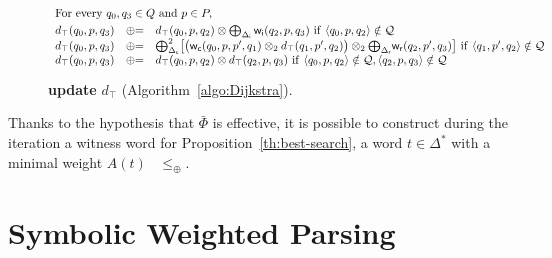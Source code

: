 \begin{figure}[ht]
\(
\begin{array}{lcl}
\multicolumn{3}{l}{%
 \mbox{For~every}\  q_0, q_3 \in Q\ \mbox{and}\ p \in P,}\\[1mm] %
d_\top(q_0, p, q_3) & \opluseq &
  d_\top(q_0, p, q_2) \otimes
  \bigoplus_{\Deltai} \weii(q_2, p, q_3)\
  \mathrm{if~} \< q_0, p, q_2> \notin \Q \\
d_\top(q_0, p, q_3) & \opluseq &
  {\bigoplus^2_{\Deltac}}
  \bigl[ \bigl( \weic(q_0, p, p', q_1) \otimes_2
  d_\top(q_1, p', q_2) \bigr) \otimes_2
  {\bigoplus_{\Deltar}} \weir(q_2, p', q_3) \bigr]\
  \mathrm{if~} \< q_1, p', q_2> \notin \Q \\
%
d_\top(q_0, p, q_3) & \opluseq &
  d_\top(q_0, p, q_2) \otimes d_\top(q_2, p, q_3)\ 
  \mathrm{if~} \< q_0, p, q_2> \notin \Q, \< q_2, p, q_3> \notin \Q \\[-1mm]
\end{array}
\)
%
\caption{\textbf{update} $d_\top$ (Algorithm~\ref{algo:Dijkstra}).}
\label{fig:best-update-top}
\end{figure}
%
Thanks to the hypothesis that $\bar\Phi$ is effective, 
it is possible to construct during the iteration a witness word
for Proposition~\ref{th:best-search}, 
\ie a word $t \in \Delta^*$ with a minimal weight $A(t)$ \wrt~$\leq_\oplus$.





\section{Symbolic Weighted Parsing}
\label{sec:parsing}


